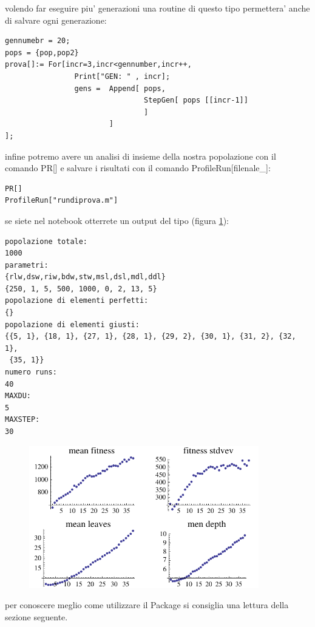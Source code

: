 \documentclass[12pt, a4paper]{article}
\begin{document}
volendo far eseguire piu' generazioni una routine di questo tipo permettera' anche di salvare ogni generazione:
\begin{lstlisting}
gennumebr = 20;
pops = {pop,pop2}
prova[]:= For[incr=3,incr<gennumber,incr++,
				Print["GEN: " , incr];
				gens = 	Append[	pops,
								StepGen[ pops [[incr-1]] 
								] 
						]
];
\end{lstlisting}

infine potremo avere un analisi di insieme della nostra popolazione con il comando PR[] e salvare i risultati con il comando ProfileRun[filenale\_]:
\begin{lstlisting}
PR[]
ProfileRun["rundiprova.m"]
\end{lstlisting}

se siete nel notebook otterrete un output del tipo (figura \ref{figure:tryout}):
\begin{lstlisting}
popolazione totale:
1000
parametri:
{rlw,dsw,riw,bdw,stw,msl,dsl,mdl,ddl}
{250, 1, 5, 500, 1000, 0, 2, 13, 5}
popolazione di elementi perfetti: 
{}
popolazione di elementi giusti: 
{{5, 1}, {18, 1}, {27, 1}, {28, 1}, {29, 2}, {30, 1}, {31, 2}, {32, 1}, 
 {35, 1}}
numero runs:
40
MAXDU:
5
MAXSTEP:
30
\end{lstlisting}

\begin{figure}[!h]
\begin{center}
\includegraphics[width=10.0cm]{pr.pdf}
\label{figure:tryout}
\end{center}
\end{figure}

per conoscere meglio come utilizzare il Package si consiglia una lettura della sezione seguente.



\end{document}
